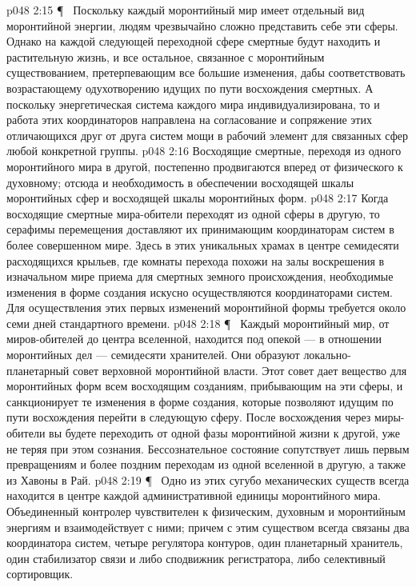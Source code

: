 \vs p048 2:15 \P\ \bibnobreakspace {} Поскольку каждый моронтийный мир имеет отдельный вид моронтийной энергии, людям чрезвычайно сложно представить себе эти сферы. Однако на каждой следующей переходной сфере смертные будут находить и растительную жизнь, и все остальное, связанное с моронтийным существованием, претерпевающим все большие изменения, дабы соответствовать возрастающему одухотворению идущих по пути восхождения смертных. А поскольку энергетическая система каждого мира индивидуализирована, то и работа этих координаторов направлена на согласование и сопряжение этих отличающихся друг от друга систем мощи в рабочий элемент для связанных сфер любой конкретной группы.
\vs p048 2:16 Восходящие смертные, переходя из одного моронтийного мира в другой, постепенно продвигаются вперед от физического к духовному; отсюда и необходимость в обеспечении восходящей шкалы моронтийных сфер и восходящей шкалы моронтийных форм.
\vs p048 2:17 Когда восходящие смертные мира\hyp{}обители переходят из одной сферы в другую, то серафимы перемещения доставляют их принимающим координаторам систем в более совершенном мире. Здесь в этих уникальных храмах в центре семидесяти расходящихся крыльев, где комнаты перехода похожи на залы воскрешения в изначальном мире приема для смертных земного происхождения, необходимые изменения в форме создания искусно осуществляются координаторами систем. Для осуществления этих первых изменений моронтийной формы требуется около семи дней стандартного времени.
\vs p048 2:18 \P\ \bibnobreakspace {} Каждый моронтийный мир, от миров\hyp{}обителей до центра вселенной, находится под опекой --- в отношении моронтийных дел --- семидесяти хранителей. Они образуют локально\hyp{}планетарный совет верховной моронтийной власти. Этот совет дает вещество для моронтийных форм всем восходящим созданиям, прибывающим на эти сферы, и санкционирует те изменения в форме создания, которые позволяют идущим по пути восхождения перейти в следующую сферу. После восхождения через миры\hyp{}обители вы будете переходить от одной фазы моронтийной жизни к другой, уже не теряя при этом сознания. Бессознательное состояние сопутствует лишь первым превращениям и более поздним переходам из одной вселенной в другую, а также из Хавоны в Рай.
\vs p048 2:19 \P\ \bibnobreakspace {} Одно из этих сугубо механических существ всегда находится в центре каждой административной единицы моронтийного мира. Объединенный контролер чувствителен к физическим, духовным и моронтийным энергиям и взаимодействует с ними; причем с этим существом всегда связаны два координатора систем, четыре регулятора контуров, один планетарный хранитель, один стабилизатор связи и либо сподвижник регистратора, либо селективный сортировщик.
